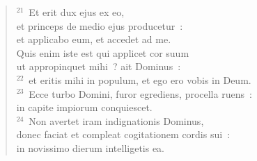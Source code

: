 \begin{verse}
${}^{21}$~Et erit dux ejus ex eo,\\ et princeps de medio ejus producetur~:\\ et applicabo eum, et accedet ad me.\\ Quis enim iste est qui applicet cor suum\\ ut appropinquet mihi~? ait Dominus~:\\
${}^{22}$~et eritis mihi in populum, et ego ero vobis in Deum.\\
${}^{23}$~Ecce turbo Domini, furor egrediens, procella ruens~:\\ in capite impiorum conquiescet.\\
${}^{24}$~Non avertet iram indignationis Dominus,\\ donec faciat et compleat cogitationem cordis sui~:\\ in novissimo dierum intelligetis ea.\end{verse}


